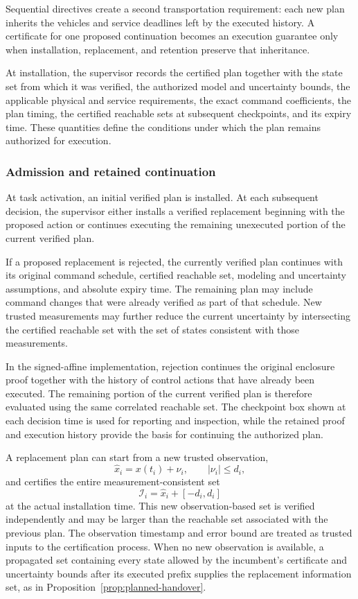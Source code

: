 \documentclass[preprint,12pt]{elsarticle}
\begin{document}
Sequential directives create a second transportation requirement: each new
plan inherits the vehicles and service deadlines left by the executed history.
A certificate for one proposed continuation becomes an execution guarantee
only when installation, replacement, and retention preserve that inheritance.

At installation, the supervisor records the certified plan together with the
state set from which it was verified, the authorized model and uncertainty
bounds, the applicable physical and service requirements, the exact command coefficients, the plan timing, the certified reachable sets
at subsequent checkpoints, and its expiry time. These quantities define the conditions under which the plan remains
authorized for execution.

\subsubsection{Admission and retained continuation}

At task activation, an initial verified plan is installed. At each subsequent
decision, the supervisor either installs a verified replacement beginning with
the proposed action or continues executing the remaining unexecuted portion of
the current verified plan.

If a proposed replacement is rejected, the currently verified plan continues
with its original command schedule, certified reachable set, modeling and
uncertainty assumptions, and absolute expiry time. The remaining plan may
include command changes that were already verified as part of that schedule.
New trusted measurements may further reduce the current uncertainty by
intersecting the certified reachable set with the set of states consistent
with those measurements.

In the signed-affine implementation, rejection continues the original
enclosure proof together with the history of control actions that have already
been executed. The remaining portion of the current verified plan is therefore
evaluated using the same correlated reachable set. The checkpoint box shown
at each decision time is used for reporting and inspection, while the retained
proof and execution history provide the basis for continuing the authorized
plan.

A replacement plan can start from a new trusted observation,
\[
\widehat x_i=x(t_i)+\nu_i,\qquad |\nu_i|\le d_i,
\]
and certifies the entire measurement-consistent set
\[
\mathcal I_i=\widehat x_i+[-d_i,d_i]
\]
at the actual installation time. This new observation-based set is verified
independently and may be larger than the reachable set associated with the
previous plan. The observation timestamp and error bound are treated as
trusted inputs to the certification process. When no new observation is
available, a propagated set containing every state allowed by the
incumbent's certificate and uncertainty bounds after its executed prefix
supplies the replacement information set, as in
Proposition~\ref{prop:planned-handover}.
\end{document}

